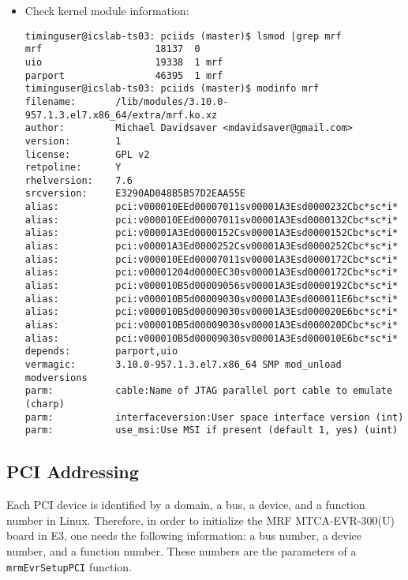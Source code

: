 \documentclass[11pt
  , a4paper
  , article
  , oneside
  , showtrims
]{memoir}
\begin{document}
{\begin{itemize}
\begin{lstlisting}[style=termstyle]
It is OK to see "E3/RULES_DKMS:37: recipe for target 'setup' failed"
---------------------------------------------------------------------
crw-rw-rw-. 1 root root 241, 0 Dec 13 10:11 /dev/uio0
crw-rw-rw-. 1 root root 241, 1 Dec 13 10:11 /dev/uio1
---------------------------------------------------------------------
\end{lstlisting}
\item Check kernel module information:
\begin{lstlisting}[style=termstyle]
timinguser@icslab-ts03: pciids (master)$ lsmod |grep mrf
mrf                    18137  0
uio                    19338  1 mrf
parport                46395  1 mrf
timinguser@icslab-ts03: pciids (master)$ modinfo mrf
filename:       /lib/modules/3.10.0-957.1.3.el7.x86_64/extra/mrf.ko.xz
author:         Michael Davidsaver <mdavidsaver@gmail.com>
version:        1
license:        GPL v2
retpoline:      Y
rhelversion:    7.6
srcversion:     E3290AD048B5B57D2EAA55E
alias:          pci:v000010EEd00007011sv00001A3Esd0000232Cbc*sc*i*
alias:          pci:v000010EEd00007011sv00001A3Esd0000132Cbc*sc*i*
alias:          pci:v00001A3Ed0000152Csv00001A3Esd0000152Cbc*sc*i*
alias:          pci:v00001A3Ed0000252Csv00001A3Esd0000252Cbc*sc*i*
alias:          pci:v000010EEd00007011sv00001A3Esd0000172Cbc*sc*i*
alias:          pci:v00001204d0000EC30sv00001A3Esd0000172Cbc*sc*i*
alias:          pci:v000010B5d00009056sv00001A3Esd0000192Cbc*sc*i*
alias:          pci:v000010B5d00009030sv00001A3Esd000011E6bc*sc*i*
alias:          pci:v000010B5d00009030sv00001A3Esd000020E6bc*sc*i*
alias:          pci:v000010B5d00009030sv00001A3Esd000020DCbc*sc*i*
alias:          pci:v000010B5d00009030sv00001A3Esd000010E6bc*sc*i*
depends:        parport,uio
vermagic:       3.10.0-957.1.3.el7.x86_64 SMP mod_unload modversions
parm:           cable:Name of JTAG parallel port cable to emulate (charp)
parm:           interfaceversion:User space interface version (int)
parm:           use_msi:Use MSI if present (default 1, yes) (uint)
\end{lstlisting}
\end{itemize}

\subsection{PCI Addressing}
Each PCI device is identified by a domain, a bus, a device, and a function number in Linux. Therefore, in order to initialize the MRF MTCA-EVR-300(U) board in E3, one needs the following information: a bus number, a device number, and a function number. These numbers are the parameters of a \texttt{mrmEvrSetupPCI} function.

}
\end{document}
